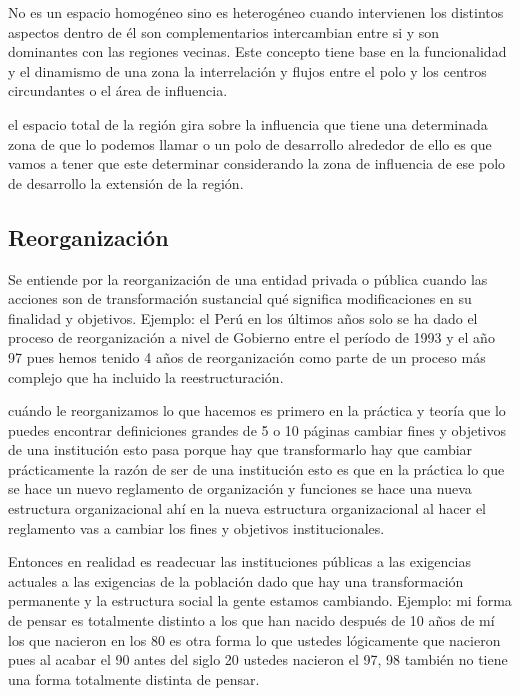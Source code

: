 \documentclass[
  letterpaper,
  DIV=11,
  numbers=noendperiod]{scrartcl}
\begin{document}
No es un espacio homogéneo sino es heterogéneo cuando intervienen los
distintos aspectos dentro de él son complementarios intercambian entre
si y son dominantes con las regiones vecinas. Este concepto tiene base
en la funcionalidad y el dinamismo de una zona la interrelación y flujos
entre el polo y los centros circundantes o el área de influencia.

el espacio total de la región gira sobre la influencia que tiene una
determinada zona de que lo podemos llamar o un polo de desarrollo
alrededor de ello es que vamos a tener que este determinar considerando
la zona de influencia de ese polo de desarrollo la extensión de la
región.

\hypertarget{reorganizaciuxf3n}{%
\subsection{Reorganización}\label{reorganizaciuxf3n}}

Se entiende por la reorganización de una entidad privada o pública
cuando las acciones son de transformación sustancial qué significa
modificaciones en su finalidad y objetivos. Ejemplo: el Perú en los
últimos años solo se ha dado el proceso de reorganización a nivel de
Gobierno entre el período de 1993 y el año 97 pues hemos tenido 4 años
de reorganización como parte de un proceso más complejo que ha incluido
la reestructuración.

cuándo le reorganizamos lo que hacemos es primero en la práctica y
teoría que lo puedes encontrar definiciones grandes de 5 o 10 páginas
cambiar fines y objetivos de una institución esto pasa porque hay que
transformarlo hay que cambiar prácticamente la razón de ser de una
institución esto es que en la práctica lo que se hace un nuevo
reglamento de organización y funciones se hace una nueva estructura
organizacional ahí en la nueva estructura organizacional al hacer el
reglamento vas a cambiar los fines y objetivos institucionales.

Entonces en realidad es readecuar las instituciones públicas a las
exigencias actuales a las exigencias de la población dado que hay una
transformación permanente y la estructura social la gente estamos
cambiando. Ejemplo: mi forma de pensar es totalmente distinto a los que
han nacido después de 10 años de mí los que nacieron en los 80 es otra
forma lo que ustedes lógicamente que nacieron pues al acabar el 90 antes
del siglo 20 ustedes nacieron el 97, 98 también no tiene una forma
totalmente distinta de pensar.
\end{document}
